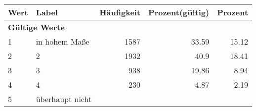      \begin{longtable}{lXrrr}
     \toprule
     \textbf{Wert} & \textbf{Label} & \textbf{Häufigkeit} & \textbf{Prozent(gültig)} & \textbf{Prozent} \\
     \endhead
     \midrule
     \multicolumn{5}{l}{\textbf{Gültige Werte}}\\

     1 &
     \multicolumn{1}{X}{ in hohem Maße   } &


       \num{1587} &
       \num[round-mode=places,round-precision=2]{33.59} &
         \num[round-mode=places,round-precision=2]{15.12} \\

     2 &
     \multicolumn{1}{X}{ 2   } &


       \num{1932} &
       \num[round-mode=places,round-precision=2]{40.9} &
         \num[round-mode=places,round-precision=2]{18.41} \\

     3 &
     \multicolumn{1}{X}{ 3   } &


       \num{938} &
       \num[round-mode=places,round-precision=2]{19.86} &
         \num[round-mode=places,round-precision=2]{8.94} \\

     4 &
     \multicolumn{1}{X}{ 4   } &


       \num{230} &
       \num[round-mode=places,round-precision=2]{4.87} &
         \num[round-mode=places,round-precision=2]{2.19} \\

     5 &
     \multicolumn{1}{X}{ überhaupt nicht   } &



\end{longtable}
